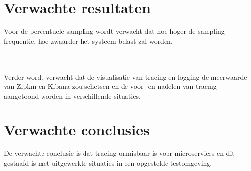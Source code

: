 \documentclass[fleqn,10pt]{voorstel}
\begin{document}
\section{Verwachte resultaten}
\label{sec:verwachte_resultaten}

Voor de percentuele sampling wordt verwacht dat hoe hoger de sampling frequentie, hoe zwaarder het systeem belast zal worden.

\\\\

Verder wordt verwacht dat de visualisatie van tracing en logging de meerwaarde van Zipkin en Kibana zou schetsen en de voor- en nadelen van tracing aangetoond worden in verschillende situaties. \\

\section{Verwachte conclusies}
\label{sec:verwachte_conclusies}

De verwachte conclusie is dat tracing onmisbaar is voor microservices en dit gestaafd is met uitgewerkte situaties in een opgestelde testomgeving. \\


\printbibliography[heading=bibintoc]
\end{document}
